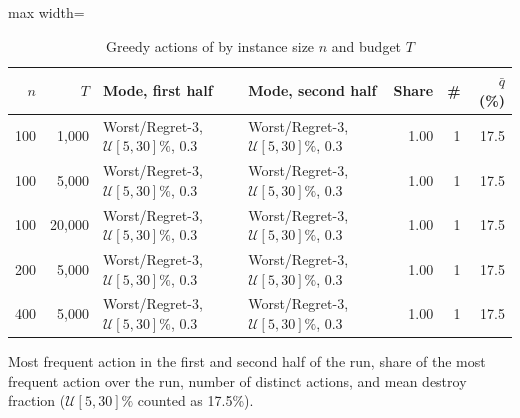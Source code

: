 \begin{table}[t]
\centering
\caption{Greedy actions of \sgc{} by instance size $n$ and budget $T$}\label{tab:ctxact}
\setlength{\tabcolsep}{2.5pt}\small
\begin{adjustbox}{max width=\linewidth}
\begin{tabular}{rrllrrr}
\toprule
$n$ & $T$ & Mode, first half & Mode, second half & Share & \# & $\bar q$ (\%)\\ \midrule
100 & 1,000 & Worst/Regret-3, $\mathcal U[5,30]\%$, 0.3 & Worst/Regret-3, $\mathcal U[5,30]\%$, 0.3 & 1.00 & 1 & 17.5\\
100 & 5,000 & Worst/Regret-3, $\mathcal U[5,30]\%$, 0.3 & Worst/Regret-3, $\mathcal U[5,30]\%$, 0.3 & 1.00 & 1 & 17.5\\
100 & 20,000 & Worst/Regret-3, $\mathcal U[5,30]\%$, 0.3 & Worst/Regret-3, $\mathcal U[5,30]\%$, 0.3 & 1.00 & 1 & 17.5\\
200 & 5,000 & Worst/Regret-3, $\mathcal U[5,30]\%$, 0.3 & Worst/Regret-3, $\mathcal U[5,30]\%$, 0.3 & 1.00 & 1 & 17.5\\
400 & 5,000 & Worst/Regret-3, $\mathcal U[5,30]\%$, 0.3 & Worst/Regret-3, $\mathcal U[5,30]\%$, 0.3 & 1.00 & 1 & 17.5\\
\bottomrule
\end{tabular}
\end{adjustbox}
\par\vspace{2pt}\parbox{\linewidth}{\footnotesize Most frequent action in the first and second half of the run, share of the most frequent action over the run, number of distinct actions, and mean destroy fraction ($\mathcal U[5,30]\%$ counted as 17.5\%).}
\end{table}
